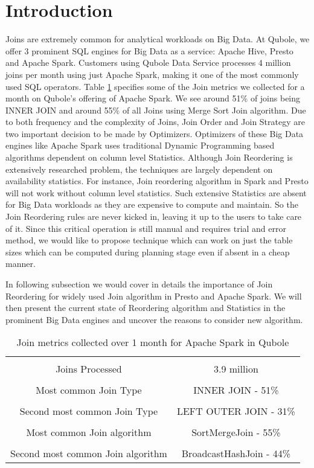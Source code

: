 \documentclass[conference]{IEEEtran}
\begin{document}
\section{Introduction}
Joins are extremely common for analytical workloads on Big Data. At Qubole, we offer 3 prominent SQL engines for Big Data as a service: Apache Hive, Presto and Apache Spark. Customers using Qubole Data Service processes 4 million joins per month using just Apache Spark, making it one of the most commonly used SQL operators. Table \ref{tab:stats} specifies some of the Join metrics we collected for a month on Qubole's offering of Apache Spark. We see around 51\% of joins being INNER JOIN and around 55\% of all Joins using Merge Sort Join algorithm. Due to both frequency and the complexity of Joins, Join Order and Join Strategy are two important decision to be made by Optimizers. Optimizers of these Big Data engines like Apache Spark uses traditional Dynamic Programming based algorithms \cite{b1} dependent on column level Statistics. Although Join Reordering is extensively researched problem, the techniques are largely dependent on availability statistics. For instance, Join reordering algorithm in Spark and Presto will not work without column level statistics.  Such extensive Statistics are absent for Big Data workloads as they are expensive to compute and maintain. So the Join Reordering rules are never kicked in, leaving it up to the users to take care of it. Since this critical operation is still manual and  requires trial and error method, we would like to propose technique which can work on just the table sizes which can be computed during planning stage even if absent in a cheap manner.

In following subsection we would cover in details the importance of Join Reordering for widely used Join algorithm in Presto and Apache Spark. We will then present the current state of Reordering algorithm and Statistics in the prominent Big Data engines and uncover the reasons to consider new algorithm.

\begin{table}[h]
\begin{center}
\begin{tabular}{ |c|c| } 
 \hline \\
Joins Processed & 3.9 million \\ \hline \\
Most common Join Type & INNER JOIN - 51\%  \\  \hline \\
Second most common Join Type &  LEFT OUTER JOIN - 31\%\\ \hline  \\
Most common Join algorithm & SortMergeJoin - 55\%\\ \hline \\
Second most common Join algorithm & BroadcastHashJoin - 44\%\\
 \hline
\end{tabular}
\caption{Join metrics collected over 1 month for Apache Spark in Qubole}
\label{tab:stats}
\end{center}
\end{table}
\end{document}
